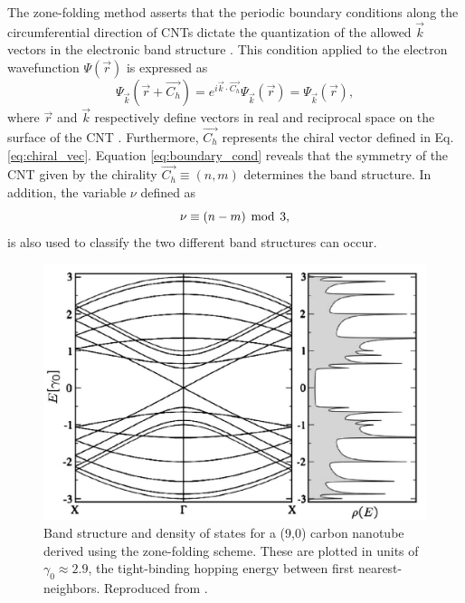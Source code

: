 The zone-folding method asserts that the periodic boundary conditions along the circumferential direction of CNTs dictate the quantization of the allowed $\vec{k}$ vectors in the electronic band structure \cite{charlier2007electronic}. This condition applied to the electron wavefunction $\Psi(\vec{r})$ is expressed as 
\begin{equation}
\Psi_{\vec{k}}(\vec{r} + \vec{C_h}) = e^{i \vec{k} \cdot \vec{C_h}} \Psi_{\vec{k}}(\vec{r}) = \Psi_{\vec{k}}(\vec{r}),
\label{eq:boundary_cond}
\end{equation}
where $\vec{r}$ and $\vec{k}$ respectively define vectors in real and reciprocal space on the surface of the CNT \cite{charlier2007electronic}. Furthermore, $\vec{C_h}$ represents the chiral vector defined in Eq. \ref{eq:chiral_vec}. Equation \ref{eq:boundary_cond} reveals that the symmetry of the CNT given by the chirality $\vec{C_h} \equiv (n,m)$ determines the band structure. In addition, the variable $\nu$ defined as 
\begin{equation}
\nu \equiv (n-m) \mathrm{\hspace{1.5mm} mod \hspace{1.5mm}} 3,
\label{eq:nu_cnt}
\end{equation}
is also used to classify the two different band structures can occur. 

\begin{figure}[h]
	\centering
	\includegraphics[scale=0.36]{images/chapter_optical_props/nine_zero_band_charlier}
	\caption{Band structure and density of states for a (9,0) carbon nanotube derived using the zone-folding scheme. These are plotted in units of $\gamma_0 \approx 2.9$, the tight-binding hopping energy between first nearest-neighbors. Reproduced from \cite{charlier2007electronic}.}
	\label{fig:nine_zero_cnt}
\end{figure}



